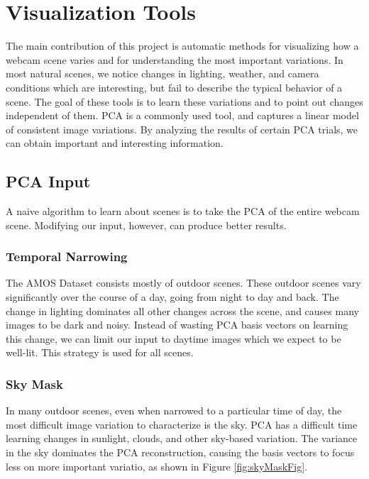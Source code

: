 \chapter{Visualization Tools}
\label{cpt:tools}

The main contribution of this project is automatic methods for visualizing how a webcam scene varies and for understanding the most important variations.  In most natural scenes, we notice changes in lighting, weather, and camera conditions which are interesting, but fail to describe the typical behavior of a scene.  The goal of these tools is to learn these variations and to point out changes independent of them.  PCA is a commonly used tool, and
captures a linear model of consistent image variations.  By analyzing the results of certain PCA trials, we can obtain important and interesting information.

\section{PCA Input}

A naive algorithm to learn about scenes is to take the PCA of the entire webcam scene.  Modifying our input, however, can produce better results.

\subsection{Temporal Narrowing}

The AMOS Dataset consists mostly of outdoor scenes.  These outdoor scenes vary significantly over the course of a day, going from night to day and back.  The change in lighting dominates all other changes across the scene, and causes many images to be dark and noisy.  Instead of wasting PCA basis vectors on learning this change, we can limit our input to daytime images which we expect to be well-lit.  This strategy is used for all scenes.

\subsection{Sky Mask}
In many outdoor scenes, even when narrowed to a particular time of day, the most difficult image variation to characterize is the sky.  PCA has a difficult time learning changes in sunlight, clouds,
and other sky-based variation.  The variance in the sky dominates the PCA reconstruction, causing the basis vectors to focus less on more important variatio, as shown in Figure \ref{fig:skyMaskFig}.

